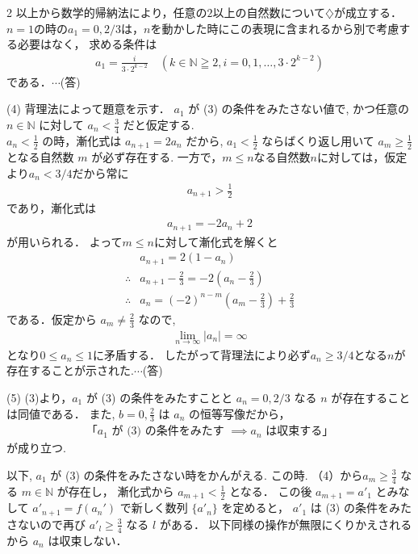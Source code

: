 \documentclass[../../../../main.tex]{subfiles}
\begin{document}
\begin{multicols}{2}
  以上から数学的帰納法により，任意の$2$以上の自然数について$\diamondsuit$が成立する．
  $n=1$の時の$a_1=0,2/3$は，$n$を動かした時にこの表現に含まれるから別で考慮する必要はなく，
  求める条件は
  \begin{align*}
    a_{1}  = \frac{i}{3 \cdot 2^{k-2}} \quad (k \in \mathbb{N} \geqq 2, i=0,1,\dots,3 \cdot 2^{k-2})
  \end{align*}
  である．$\cdots$(答)

  \vspace{10pt}
  (4)
  背理法によって題意を示す．
  $a_1$ が (3) の条件をみたさない値で, かつ任意の $n \in \mathbb{N}$ に対して $a_n < \frac{3}{4}$ だと仮定する. \\
  $a_n < \frac{1}{2}$ の時，漸化式は $a_{n+1} = 2a_n$ だから, $a_1 < \frac{1}{2}$ ならばくり返し用いて $a_m \ge \frac{1}{2}$ となる自然数 $m$ が必ず存在する.
  一方で，$m \le n$なる自然数$n$に対しては，仮定より$a_n < 3/4$だから常に
  \begin{align*}
    a_{n+1} > \frac{1}{2}
  \end{align*}
  であり，漸化式は
  \begin{align*}
    a_{n+1} = -2 a_{n} + 2
  \end{align*}
  が用いられる．
  よって$m \le n$に対して漸化式を解くと
  \begin{align*}
     & a_{n+1} = 2(1-a_n)                                            \\
    \therefore
     & a_{n+1} - \frac{2}{3} = -2\left(a_n - \frac{2}{3}\right)      \\
    \therefore
     & a_n = (-2)^{n-m} \left(a_m - \frac{2}{3}\right) + \frac{2}{3}
  \end{align*}
  である．仮定から $a_m \ne \frac{2}{3}$ なので,
  \begin{align*}
    \lim_{n\to\infty} |a_n| = \infty
  \end{align*}
  となり$0 \le a_n \le 1$に矛盾する．
  したがって背理法により必ず$a_n \ge 3/4$となる$n$が存在することが示された.$\cdots$(答)

  \vspace{10pt}
  (5)
  (3)より，$a_1$ が (3) の条件をみたすことと $a_n=0, 2/3$ なる $n$ が存在することは同値である．
  また, $b=0, \frac{2}{3}$ は $a_n$ の恒等写像だから，
  \begin{align}
    \text{「$a_1$ が (3) の条件をみたす $\implies a_n$ は収束する」} \label{2002-3:eq:1}
  \end{align}
  が成り立つ.

  以下, $a_1$ が (3) の条件をみたさない時をかんがえる.
  この時. （4）から$a_m \ge \frac{3}{4}$ なる $m \in \mathbb{N}$ が存在し，
  漸化式から $a_{m+1} < \frac{1}{2}$ となる．
  この後 $a_{m+1}=a'_1$ とみなして $a'_{n+1} = f(a_n')$ で新しく数列 $\{a'_n\}$ を定めると，
  $a'_{1}$ は (3) の条件をみたさないので再び $a'_{l} \ge \frac{3}{4}$ なる $l$ がある．
  以下同様の操作が無限にくりかえされるから $a_n$ は収束しない．


\end{multicols}
\end{document}
